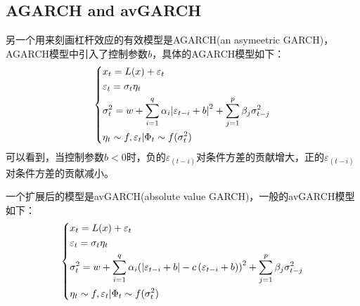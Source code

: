     \subsection{AGARCH and avGARCH}
        另一个用来刻画杠杆效应的有效模型是AGARCH(an asymeetric GARCH)，AGARCH模型中引入了控制参数$b$，具体的AGARCH模型如下：
        \begin{equation*}
        \centering
        \left\{\begin{lgathered}
        {x_t} = L(x) + {\varepsilon _t}\\
        {\varepsilon _t} = {\sigma _t}{\eta _t}\\
        \sigma _t^2 = w + \sum\limits_{i = 1}^q {{\alpha _i}{{\left| {{\varepsilon _{t - i}} + b} \right|}^2}}  + \sum\limits_{j = 1}^p {{\beta _j}\sigma _{t - j}^2} \\
        {\eta _t} \sim f,{\varepsilon _t}|{\Phi _t} \sim f(\sigma _t^2)
        \end{lgathered} \right.
         \end{equation*}
        可以看到，当控制参数$b<0$时，负的$\varepsilon_{(t-i)}$对条件方差的贡献增大，正的$\varepsilon_{(t-i)}$对条件方差的贡献减小。
        \par
        一个扩展后的模型是avGARCH(absolute value GARCH)，一般的avGARCH模型如下：
        \begin{equation*}
        \centering
        \left\{\begin{lgathered}
        {x_t} = L(x) + {\varepsilon _t}\\
        {\varepsilon _t} = {\sigma _t}{\eta _t}\\
        \sigma _t^2 = w + \sum\limits_{i = 1}^q {{\alpha _i}{{\left( {\left| {{\varepsilon _{t - i}} + b} \right| - c\left( {{\varepsilon _{t - i}} + b} \right)} \right)}^2}}  + \sum\limits_{j = 1}^p {{\beta _j}\sigma _{t - j}^2} \\
        {\eta _t} \sim f,{\varepsilon _t}|{\Phi _t} \sim f(\sigma _t^2)
        \end{lgathered} \right.
         \end{equation*}

